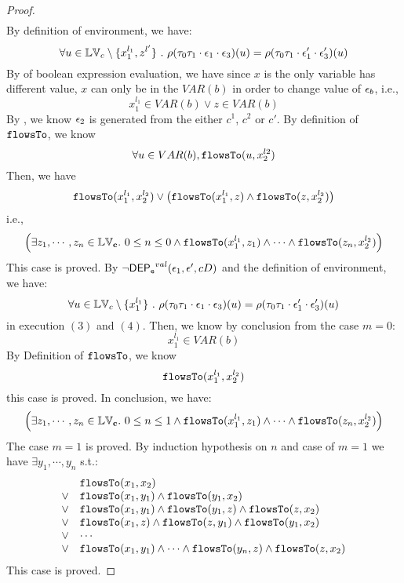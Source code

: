 \begin{proof}
\[\begin{array}{l}
\end{array}
 \]
 By definition of environment, we have:
\[
  \forall u \in \mathbb{LV}_c \setminus \{x_1^{l_1}, z^{l'}\} ~.~
  \rho(\mathtt{\tau}_0 \mathtt{\tau}_1 \cdot \mathtt{\epsilon}_1 \cdot \mathtt{\epsilon}_3 ) (u) =  
  \rho(\mathtt{\tau}_0 \mathtt{\tau}_1 \cdot \mathtt{\epsilon}_1' \cdot \mathtt{\epsilon}_3') (u)
\]
%
By  of boolean expression evaluation, we have since $x$ is the only variable has different value, $x$ can only be in the $VAR(b)$ in order to change value of $\mathtt{\epsilon}_b$, i.e.,
 \[
  x_1^{l_1} \in VAR(b) \lor z \in VAR(b)
 \]
 By , we know $\mathtt{\epsilon}_2$ is generated from the either $c^1$, $c^2$ or $c'$.
 By definition of $\mathtt{flowsTo}$, we know
 \[
 \forall u \in VAR(b), \mathtt{flowsTo}(u, x_2^{l2})
 \]
 Then, we have
 \[
  \mathtt{flowsTo}(x_1^{l_1}, x_2^{l_2}) \lor 
  \big(\mathtt{flowsTo}(x_1^{l_1}, z) \land \mathtt{flowsTo}(z, x_2^{l_2}) \big)
 \]
 i.e.,
 \[
 \Big( \exists z_1, \cdots, z_n \in \mathbb{LV}_{{\boldsymbol{\mathbf{c}}}}. ~ 0 \leq n \leq 0 \land
  \mathtt{flowsTo}(x_1^{l_1}, z_1) 
  \land \cdots \land \mathtt{flowsTo}(z_n, x_2^{l_2}) \Big)
 \]
 This case is proved.
%
%
By $\neg \mathsf{DEP_{\mathtt{e}}}^{val}(\mathtt{\epsilon}_1, \mathtt{\epsilon}', c D)$ and the definition of environment, we have:
\[
  \forall u \in \mathbb{LV}_c \setminus \{x_1^{l_1}\} ~.~
  \rho(\mathtt{\tau}_0 \mathtt{\tau}_1 \cdot \mathtt{\epsilon}_1 \cdot \mathtt{\epsilon}_3 ) (u) =  
  \rho(\mathtt{\tau}_0 \mathtt{\tau}_1 \cdot \mathtt{\epsilon}_1' \cdot \mathtt{\epsilon}_3') (u)
\]
in execution $(3)$ and $(4)$.
%
Then, we know by conclusion from the case $m = 0$:
\[
  x_1^{l_1} \in VAR(b)
\]
%
By Definition of $\mathtt{flowsTo}$, we know
\[
  \mathtt{flowsTo}(x_1^{l_1}, x_2^{l_2}) 
\]
this case is proved.
%
In conclusion, we have:
\[
  \Big( \exists z_1, \cdots, z_n \in \mathbb{LV}_{{\boldsymbol{\mathbf{c}}}}. ~ 0 \leq n \leq 1 \land
  \mathtt{flowsTo}(x_1^{l_1}, z_1) 
  \land \cdots \land \mathtt{flowsTo}(z_n, x_2^{l_2}) \Big)
\]
The case $m = 1$ is proved.
%
By induction hypothesis on $n$ and case of $m = 1$ we have $\exists y_1, \cdots, y_n$ s.t.:
\[
\begin{array}{ll}
      & \mathtt{flowsTo}(x_1, x_2) \\
  \lor  & \mathtt{flowsTo}(x_1, y_1) \land \mathtt{flowsTo}(y_1, x_2)\\
  \lor  & \mathtt{flowsTo}(x_1, y_1) \land \mathtt{flowsTo}(y_1, z) \land \mathtt{flowsTo}(z, x_2) \\
  \lor  & \mathtt{flowsTo}(x_1, z) \land \mathtt{flowsTo}(z, y_1) \land \mathtt{flowsTo}(y_1, x_2) \\
  \lor  & \cdots \\
  \lor  & \mathtt{flowsTo}(x_1, y_1) \land \cdots \land \mathtt{flowsTo}(y_n, z) \land \mathtt{flowsTo}(z, x_2) \\
\end{array}
\]
This case is proved.
\end{proof}